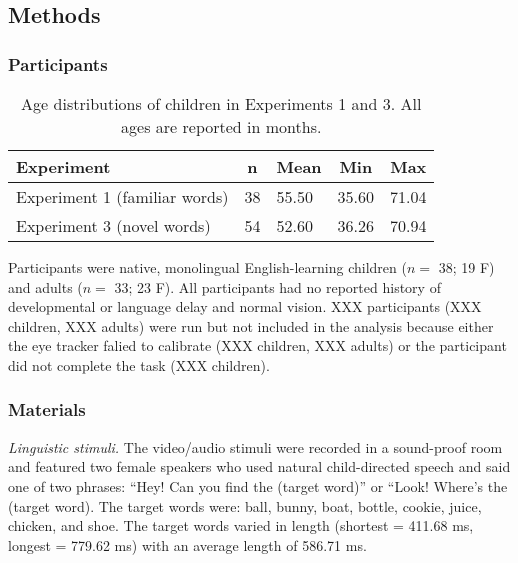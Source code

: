 \documentclass[man,floatsintext]{apa6}
\begin{document}
\subsection{Methods}\label{methods}

\subsubsection{Participants}\label{participants}

\begin{table}[tbp]
\begin{center}
\begin{threeparttable}
\caption{\label{tab:make-ss-table}Age distributions of children in Experiments 1 and 3. All ages are reported in months.}
\begin{tabular}{lllll}
\toprule
Experiment & \multicolumn{1}{c}{n} & \multicolumn{1}{c}{Mean} & \multicolumn{1}{c}{Min} & \multicolumn{1}{c}{Max}\\
\midrule
Experiment 1 (familiar words) & 38 & 55.50 & 35.60 & 71.04\\
Experiment 3 (novel words) & 54 & 52.60 & 36.26 & 70.94\\
\bottomrule
\end{tabular}
\end{threeparttable}
\end{center}
\end{table}

Participants were native, monolingual English-learning children (\(n=\)
38; 19 F) and adults (\(n=\) 33; 23 F). All participants had no reported
history of developmental or language delay and normal vision. XXX
participants (XXX children, XXX adults) were run but not included in the
analysis because either the eye tracker falied to calibrate (XXX
children, XXX adults) or the participant did not complete the task (XXX
children).

\subsubsection{Materials}\label{materials}

\emph{Linguistic stimuli.} The video/audio stimuli were recorded in a
sound-proof room and featured two female speakers who used natural
child-directed speech and said one of two phrases: \enquote{Hey! Can you
find the (target word)} or ``Look! Where's the (target word). The target
words were: ball, bunny, boat, bottle, cookie, juice, chicken, and shoe.
The target words varied in length (shortest = 411.68 ms, longest =
779.62 ms) with an average length of 586.71 ms.
\end{document}
